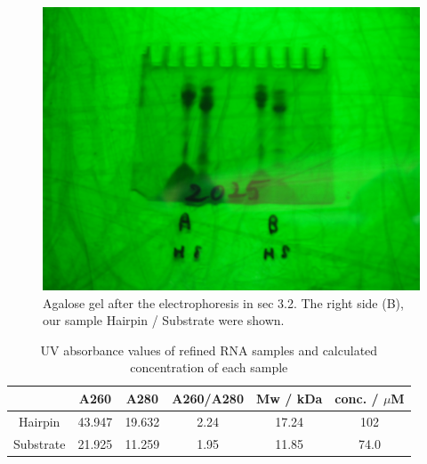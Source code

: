 \documentclass{ltjsarticle}
\theoremstyle{definition}
\numberwithin{equation}{section}
\begin{document}
\begin{figure}[htbp]
\begin{center}
\includegraphics[width = 10 cm]{250711_A,B.JPG}
\caption{Agalose gel after the electrophoresis in sec 3.2. The right side (B), our sample Hairpin / Substrate were shown.}
\label{gel}
\end{center}
\end{figure}

\begin{table}[htp]
\caption{UV absorbance values of refined RNA samples and calculated concentration of each sample}
\begin{center}
\begin{tabular}{cccccc}
\hline
 & A260 & A280 & A260/A280 & Mw / kDa & conc. / $\mu$M \\ \hline\hline
Hairpin & 43.947 & 19.632 & 2.24 & 17.24 & 102\\
Substrate & 21.925 & 11.259 & 1.95 & 11.85& 74.0 \\\hline
\end{tabular}
\end{center}
\label{table_nanodrop}
\end{table}%
\end{document}

